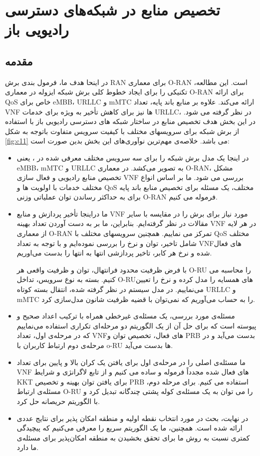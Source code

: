 \chapter{تخصیص منابع در شبکه‌های دسترسی رادیویی باز}
\section{مقدمه}
در اینحا هدف ما، فرمول بندی برش RAN برای معماری O-RAN است. این مطالعه، تکنیکی را برای ایجاد خطوط کلی برش شبکه ایزوله در معماری O-RAN برای ارائه QoS خاص برای eMBB، URLLC و mMTC ارائه می‌کند. علاوه بر منابع باند پایه، تعداد VNF ها نیز برای کاهش تأخیر به ویژه برای خدمات URLLC، در نظر گرفته می شود.
در این بخش هدف تخصیص منابع در ساختار شبکه های دسترسی رادیویی باز با استفاده از برش شبکه برای سرویسهای مختلف با کیفیت سرویس متفاوت باتوجه به شکل \ref{fig:c11} می باشد. 
خلاصه‌ی مهم‌ترین نوآوری‌های این بخش بدین صورت است:
\begin{itemize}
	\item 
	در اینجا یک مدل برش شبکه را برای سه سرویس مختلف معرفی شده در ، یعنی eMBB، mMTC و URLLC به تصویر می‌کشد. در معماری O-RAN، مشکل تخصیص منابع رادیویی و فعال سازی VNF بررسی می شود.
	ما بر اساس انواع مختلف خدمات با اولویت ها و QoS مختلف، یک مسئله برای تخصیص منابع باند پایه برای به حداکثر رساندن توان عملیاتی وزنی O-RAN فرموله می کنیم.
	\item 
	ما دراینجا تأخیر پردازش و منابع VNF مورد نیاز برای برش را در مقایسه با سایر مقالات در نظر گرفته‌ایم. بنابراین، ما بر به دست آوردن تعداد بهینه VNF در هر لایه از معماری O-RAN تمرکز می نماییم.
	همچنین سرویسهای مختلف با QoS مختلف شامل تاخیر، توان و نرخ را بررسی نموده‌ایم و با توجه به تعداد VNFهای فعال شده و نرخ هر کابر، تاخیر پردازشی انتها به انتها را بدست می‌اوریم.
	
	با فرض ظرفیت محدود فرانتهال، توان و ظرفیت واقعی هر O-RU را محاسبه می کنیم. بسته به نوع سرویس، تداخل O-RUهای همسایه را مدل کرده و نرخ را تعیین می‌نماییم. در مدل سیستم در نظر گرفته شده، انتقال بسته کوتاه URLLC و mMTC را به حساب می‌آوریم که نمی‌توان با قضیه ظرفیت شانون مدل‌سازی کرد.
\item 	
مسئله‌ی مورد بررسی، یک مسئله‌ی غیرخطی همراه با  ترکیب اعداد صحیح و پیوسته است که برای حل آن از یک الگوریتم دو مرحله‌ای تکراری استفاده می‌نماییم که در مرحله‌ی اول، تعداد VNFهای فعال، تخصیص توان و PRB بدست می‌آید و در مرحله‌ی دوم ارتباط کاربران با o-RU ها بدست می‌آید.
\item 
ما مسئله‌ی اصلی را در مرحله‌ی اول برای یافتن یک کران بالا و پایین برای تعداد VNF های فعال شده مجدداً فرموله و ساده می کنیم و از تابع لاگرانژی و شرایط KKT برای یافتن توان بهینه و تخصیص PRB استفاده می کنیم.
برای مرحله دوم، مسئله‌ی ارتباط O-RU را می توان به یک مسئله‌ی کوله پشتی چندگانه تبدیل کرد و با الگوریتم حریصانه حل کرد.
\item 
در نهایت، بحث در مورد انتخاب نقطه اولیه و منطقه امکان پذیر برای نتایج عددی ارائه شده است. همچنین، ما یک الگوریتم سریع را معرفی می‌کنیم که پیچیدگی کمتری نسبت به روش ما برای تحقق بخشیدن به منطقه امکان‌پذیر برای مسئله‌ی ما دارد. 
\end{itemize} 

